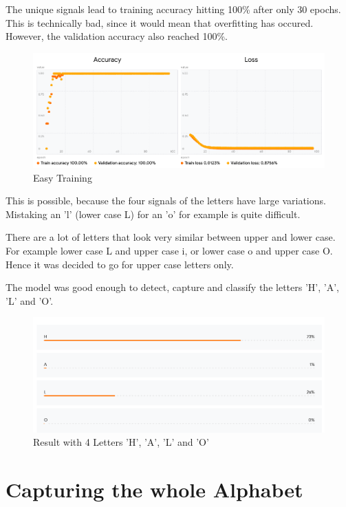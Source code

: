 \documentclass[a4paper,titlepage]{article}
\begin{document}
The unique signals lead to training accuracy hitting 100\% after only 30 epochs.
This is technically bad, since it would mean that overfitting has occured.
However, the validation accuracy also reached 100\%.

\begin{figure}[H]
    \includegraphics[width=\textwidth]{very_fast_training_reults_HALO.png}
    \caption{Easy Training}
\end{figure}

\newpage
This is possible, because the four signals of the letters have large variations.
Mistaking an 'l' (lower case L) for an 'o' for example is quite difficult.

There are a lot of letters that look very similar between upper and lower case.
For example lower case L and upper case i, or lower case o and upper case O.
Hence it was decided to go for upper case letters only.

The model was good enough to detect, capture and classify the letters 'H', 'A', 'L' and 'O'.

\begin{figure}[H]
    \includegraphics[width=\textwidth]{result_HALO.png}
    \caption{Result with 4 Letters 'H', 'A', 'L' and 'O'}
\end{figure}

\newpage
\section{Capturing the whole Alphabet}
\end{document}
